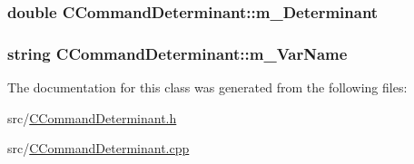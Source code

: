 \subsubsection[{\texorpdfstring{m\+\_\+\+Determinant}{m_Determinant}}]{\setlength{\rightskip}{0pt plus 5cm}double C\+Command\+Determinant\+::m\+\_\+\+Determinant}\hypertarget{classCCommandDeterminant_a4a8778e30170613ead5997c7b18438c8}{}\label{classCCommandDeterminant_a4a8778e30170613ead5997c7b18438c8}
\subsubsection[{\texorpdfstring{m\+\_\+\+Var\+Name}{m_VarName}}]{\setlength{\rightskip}{0pt plus 5cm}string C\+Command\+Determinant\+::m\+\_\+\+Var\+Name\hspace{0.3cm}{\ttfamily [private]}}\hypertarget{classCCommandDeterminant_aa5df4a490c14743c5d6a4e65df406bc3}{}\label{classCCommandDeterminant_aa5df4a490c14743c5d6a4e65df406bc3}


The documentation for this class was generated from the following files\+:\begin{DoxyCompactItemize}
\item 
src/\hyperlink{CCommandDeterminant_8h}{C\+Command\+Determinant.\+h}\item 
src/\hyperlink{CCommandDeterminant_8cpp}{C\+Command\+Determinant.\+cpp}\end{DoxyCompactItemize}
